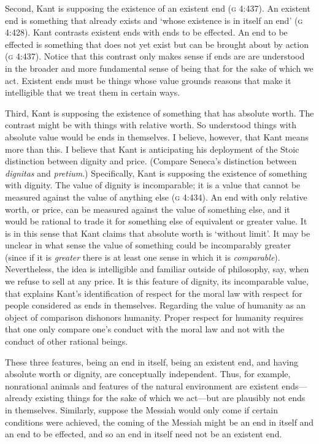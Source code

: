 \documentclass[a4paper,12pt]{article}
\begin{document}
Second, Kant is supposing the existence of an existent end (\textsc{g} 4:437). An existent end is something that already exists and `whose existence is in itself an end' (\textsc{g} 4:428). Kant contrasts existent ends with ends to be effected. An end to be effected is something that does not yet exist but can be brought about by action (\textsc{g} 4:437). Notice that this contrast only makes sense if ends are are understood in the broader and more fundamental sense of being that for the sake of which we act. Existent ends must be things whose value grounds reasons that make it intelligible that we treat them in certain ways.

Third, Kant is supposing the existence of something that has absolute worth. The contrast might be with things with relative worth. So understood things with absolute value would be ends in themselves. I believe, however, that Kant means more than this. I believe that Kant is anticipating his deployment of the Stoic distinction between dignity and price. (Compare Seneca's distinction between \emph{dignitas} and \emph{pretium}.) Specifically, Kant is supposing the existence of something with dignity. The value of dignity is incomparable; it is a value that cannot be measured against the value of anything else (\textsc{g} 4:434). An end with only relative worth, or price, can be measured against the value of something else, and it would be rational to trade it for something else of equivalent or greater value. It is in this sense that Kant claims that absolute worth is `without limit'. It may be unclear in what sense the value of something could be incomparably greater (since if it is \emph{greater} there is at least one sense in which it is \emph{comparable}). Nevertheless, the idea is intelligible and familiar outside of philosophy, say, when we refuse to sell at any price. It is this feature of dignity, its incomparable value, that explains Kant's identification of respect for the moral law with respect for people considered as ends in themselves. Regarding the value of humanity as an object of comparison dishonors humanity. Proper respect for humanity requires that one only compare one's conduct with the moral law and not with the conduct of other rational beings.

These three features, being an end in itself, being an existent end, and having absolute worth or dignity, are conceptually independent. Thus, for example, nonrational animals and features of the natural environment are existent ends---already existing things for the sake of which we act---but are plausibly not ends in themselves. Similarly, suppose the Messiah would only come if certain conditions were achieved, the coming of the Messiah might be an end in itself and an end to be effected, and so an end in itself need not be an existent end. 
\end{document}
